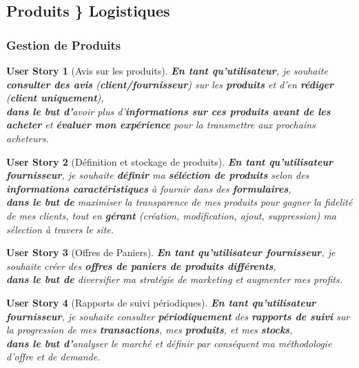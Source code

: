 \documentclass[a4paper,12pt]{book}
\theoremstyle{break}
\newtheorem*{userStory}{User Story}
\theoremstyle{break}
\theoremstyle{break}
\theoremstyle{break}
\theoremstyle{definition}
\theoremstyle{remark}
\begin{document}
\subsection{Produits \} Logistiques}
\subsubsection{Gestion de Produits}
\begin{userStory}[Avis sur les produits]
\textbf{En tant qu'utilisateur}, je souhaite \textbf{consulter des avis} (\textbf{{\color{green}client}/{\color{red}fournisseur}}) sur les \textbf{produits} et d'en \textbf{rédiger} (\textbf{{\color{green}client} uniquement}),\\
\indent
\textbf{dans le but d'}avoir plus d'\textbf{informations sur ces produits avant de les acheter} et \textbf{évaluer mon expérience} pour la transmettre aux prochains acheteurs.
\end{userStory}

\begin{userStory}[Définition et stockage de produits]
\textbf{En tant qu'utilisateur {\color{red}fournisseur}}, je souhaite \textbf{définir} ma \textbf{séléction de produits} selon des \textbf{informations caractéristiques} à fournir dans des \textbf{formulaires},\\
\indent
\textbf{dans le but de} maximiser la transparence de mes produits pour gagner la fidelité de mes clients, tout en \textbf{gérant} (création, modification, ajout, suppression) ma sélection à travers le site.
\end{userStory}

\begin{userStory}[Offres de Paniers]
\textbf{En tant qu'utilisateur {\color{red}fournisseur}}, je souhaite créer des \textbf{offres de paniers de produits différents},\\
\indent
\textbf{dans le but de} diversifier ma stratégie de marketing et augmenter mes profits.
\end{userStory}

\begin{userStory}[Rapports de suivi périodiques]
\textbf{En tant qu'utilisateur {\color{red}fournisseur}}, je souhaite consulter \textbf{périodiquement} des \textbf{rapports de suivi} sur la progression de mes \textbf{transactions}, mes \textbf{produits}, et mes \textbf{stocks},\\
\indent
\textbf{dans le but d'}analyser le marché et définir par conséquent ma méthodologie d'offre et de demande.
\end{userStory}
\end{document}
